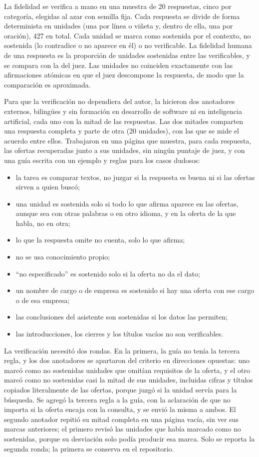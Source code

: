 La fidelidad se verifica a mano en una muestra de 20 respuestas, cinco por categoría, elegidas al azar con semilla fija. Cada respuesta se divide de forma determinista en unidades (una por línea o viñeta y, dentro de ella, una por oración), 427 en total. Cada unidad se marca como sostenida por el contexto, no sostenida (lo contradice o no aparece en él) o no verificable. La fidelidad humana de una respuesta es la proporción de unidades sostenidas entre las verificables, y se compara con la del juez. Las unidades no coinciden exactamente con las afirmaciones atómicas en que el juez descompone la respuesta, de modo que la comparación es aproximada.

Para que la verificación no dependiera del autor, la hicieron dos anotadores externos, bilingües y sin formación en desarrollo de software ni en inteligencia artificial, cada uno con la mitad de las respuestas. Las dos mitades comparten una respuesta completa y parte de otra (20 unidades), con las que se mide el acuerdo entre ellos. Trabajaron en una página que muestra, para cada respuesta, las ofertas recuperadas junto a sus unidades, sin ningún puntaje de juez, y con una guía escrita con un ejemplo y reglas para los casos dudosos:
\begin{itemize}
    \item la tarea es comparar textos, no juzgar si la respuesta es buena ni si las ofertas sirven a quien buscó;
    \item una unidad es sostenida solo si todo lo que afirma aparece en las ofertas, aunque sea con otras palabras o en otro idioma, y en la oferta de la que habla, no en otra;
    \item lo que la respuesta omite no cuenta, solo lo que afirma;
    \item no se usa conocimiento propio;
    \item \enquote{no especificado} es sostenido solo si la oferta no da el dato;
    \item un nombre de cargo o de empresa es sostenido si hay una oferta con ese cargo o de esa empresa;
    \item las conclusiones del asistente son sostenidas si los datos las permiten;
    \item las introducciones, los cierres y los títulos vacíos no son verificables.
\end{itemize}

La verificación necesitó dos rondas. En la primera, la guía no tenía la tercera regla, y los dos anotadores se apartaron del criterio en direcciones opuestas: uno marcó como no sostenidas unidades que omitían requisitos de la oferta, y el otro marcó como no sostenidas casi la mitad de sus unidades, incluidas cifras y títulos copiados literalmente de las ofertas, porque juzgó si la unidad servía para la búsqueda. Se agregó la tercera regla a la guía, con la aclaración de que no importa si la oferta encaja con la consulta, y se envió la misma a ambos. El segundo anotador repitió su mitad completa en una página vacía, sin ver sus marcas anteriores; el primero revisó las unidades que había marcado como no sostenidas, porque su desviación solo podía producir esa marca. Solo se reporta la segunda ronda; la primera se conserva en el repositorio.

